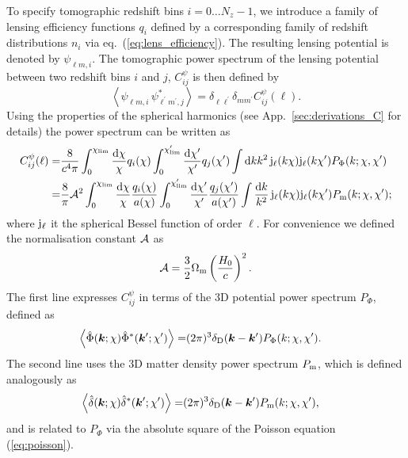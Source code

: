 \documentclass[fleqn,usenatbib]{mnras} %
\newcommand{\pref}{{\cal A}}
\renewcommand{\vec}{\bm}
\begin{document}
To specify tomographic redshift bins $i=0\ldots N_z-1$, we introduce a family
of lensing efficiency functions $q_i$ defined by a corresponding family of
redshift distributions $n_i$ via eq.~(\ref{eq:lens_efficiency}). The resulting
lensing potential is denoted by $\psi_{\ell m, i}$. The tomographic power
spectrum of the lensing potential between two redshift bins $i$ and $j$,
$C_{ij}^\psi$ is then defined by \cite{pee80}
%
\begin{equation}
  \left\langle \psi^{}_{\ell m, i} \, \psi^\ast_{\ell^\prime m^\prime, j} \right\rangle
    = \delta_{\ell \ell^\prime} \delta_{m m^\prime} C^\psi_{ij}(\ell) .
  \label{eq:C_ell_psi}
\end{equation}
%
Using the properties of the spherical harmonics (see
App.~\ref{sec:derivations_C} for details) the power spectrum can be written as
%
\begin{align}
  C_{ij}^\psi(\ell) = & \frac 8 {c^4 \pi} 
  \int_0^{\chi_{\rm lim}} \frac{{\rm d}\chi}{\chi} q_i(\chi)
  \int_0^{\chi^\prime_{\rm lim}} \frac{{\rm d}\chi^\prime}{\chi^\prime} q_j(\chi^\prime)
  \int {\rm d} k k^2 \, {\rm j}_\ell(k \chi) {\rm j}_\ell(k \chi^\prime) P_\Phi(k; \chi, \chi^\prime)
  \label{eq:C_ell_phi_Pphi} \\
  = & \frac 8 \pi \pref^2
  \int_0^{\chi_{\rm lim}} \frac{{\rm d}\chi}{\chi} \frac{q_i(\chi)}{a(\chi)}
  \int_0^{\chi^\prime_{\rm lim}} \frac{{\rm d}\chi^\prime}{\chi^\prime} \frac{q_j(\chi^\prime)}{a(\chi^\prime)}
  \int \frac{{\rm d} k}{k^2} \, {\rm j}_\ell(k \chi) {\rm j}_\ell(k \chi^\prime) P_{\rm m}(k; \chi, \chi^\prime) ;
  \label{eq:C_ell_phi_Pm}
\end{align}
%
where ${\rm j}_\ell$ it the spherical Bessel function of order $\ell$. For
convenience we defined the normalisation constant $\pref$ as
%
\begin{equation}
  \pref = \frac 3 2 \Omega_{\rm m} \left(\frac{H_0} c\right)^2.
  \label{eq:pref}
\end{equation}
%
The first line expresses $C_{ij}^\psi$ in terms of the 3D potential power spectrum $P_\Phi$, defined as
%
\begin{align}
  \left\langle \hat \Phi(\vec k; \chi) \hat \Phi^\ast(\vec k^\prime; \chi^\prime) \right\rangle
    = & (2\pi)^3 \delta_{\rm D}(\vec k - \vec k^\prime) P_\Phi(k; \chi, \chi^\prime).
  \label{eq:p_phi}
\end{align}
%
The second line uses the 3D matter density power spectrum $P_{\rm m}$, which is defined analogously as
%
\begin{align}
  \left\langle \hat \delta(\vec k; \chi) \hat \delta^\ast(\vec k^\prime; \chi^\prime) \right\rangle
    = & (2\pi)^3 \delta_{\rm D}(\vec k - \vec k^\prime) P_{\rm m}(k; \chi, \chi^\prime),
  \label{eq:p_m}
\end{align}
%
and is
related to $P_\Phi$ via the absolute square of the Poisson equation (\ref{eq:poisson}).
\end{document}
